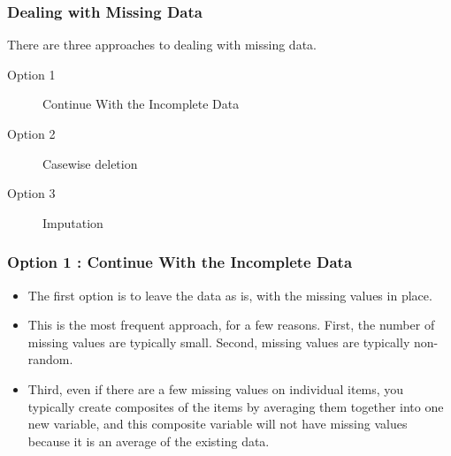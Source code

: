 \documentclass[MASTER.tex]{subfiles}
\begin{document}
	\begin{frame}
		\Large
		\frametitle{Dealing with Missing Data}
		There are three approaches to dealing with missing data.
		\begin{description}
			\item[ Option 1] Continue With the Incomplete Data
			\item[ Option 2] Casewise deletion
			\item[ Option 3] Imputation
		\end{description}
	\end{frame}
	\begin{frame}
		\Large
		\frametitle{Option 1 : Continue With the Incomplete Data}
		\begin{itemize}
\item The first option is to leave the data as is, with the missing values in place. 
\item This is the most frequent approach, for a few reasons. First, the number of missing values are typically small. Second, missing values are typically non-random. 
\item Third, even if there are a few missing values on individual items, you typically create composites of the items by averaging them together into one new variable, and this composite variable will not have missing values because it is an average of the existing data. 
		\end{itemize}

		
		
	\end{frame}
\end{document}
